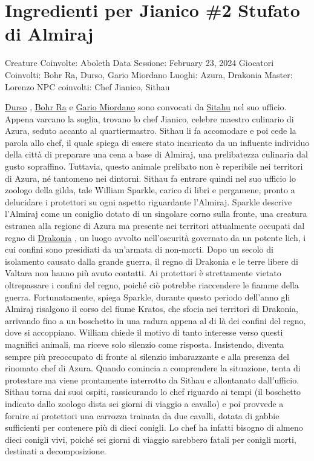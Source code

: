 \section{Ingredienti per Jianico \#2 Stufato di
Almiraj}\label{ingredienti-per-jianico-2-stufato-di-almiraj}

Creature Coinvolte: Aboleth Data Sessione: February 23, 2024 Giocatori
Coinvolti: Bohr Ra, Durso, Gario Miordano Luoghi: Azura, Drakonia
Master: Lorenzo NPC coinvolti: Chef Jianico, Sithau

\href{Durso\%201300f1f2704341b8af557e877374018c.md}{Durso} ,
\href{Bohr\%20Ra\%2064449ef6c46549e9abf62b9d7e01a69d.md}{Bohr Ra} e
\href{Gario\%20Miordano\%20e4415ce5ce8d4e8a834479901942d838.md}{Gario
Miordano} sono convocati da
\href{Sitahu\%203e1abded771c4c39a375ae0243478a44.md}{Sitahu} nel suo
ufficio. Appena varcano la soglia, trovano lo chef Jianico, celebre
maestro culinario di Azura, seduto accanto al quartiermastro. Sithau li
fa accomodare e poi cede la parola allo chef, il quale spiega di essere
stato incaricato da un influente individuo della città di preparare una
cena a base di Almiraj, una prelibatezza culinaria dal gusto sopraffino.
Tuttavia, questo animale prelibato non è reperibile nei territori di
Azura, né tantomeno nei dintorni. Sithau fa entrare quindi nel suo
ufficio lo zoologo della gilda, tale William Sparkle, carico di libri e
pergamene, pronto a delucidare i protettori su ogni aspetto riguardante
l'Almiraj. Sparkle descrive l'Almiraj come un coniglio dotato di un
singolare corno sulla fronte, una creatura estranea alla regione di
Azura ma presente nei territori attualmente occupati dal regno di
\href{Drakonia\%207646694c0d12453293a9b7e41d5cdb15.md}{Drakonia} , un
luogo avvolto nell'oscurità governato da un potente lich, i cui confini
sono presidiati da un'armata di non-morti. Dopo un secolo di isolamento
causato dalla grande guerra, il regno di Drakonia e le terre libere di
Valtara non hanno più avuto contatti. Ai protettori è strettamente
vietato oltrepassare i confini del regno, poiché ciò potrebbe
riaccendere le fiamme della guerra. Fortunatamente, spiega Sparkle,
durante questo periodo dell'anno gli Almiraj risalgono il corso del
fiume Kratos, che sfocia nei territori di Drakonia, arrivando fino a un
boschetto in una radura appena al di là dei confini del regno, dove si
accoppiano. William chiede il motivo di tanto interesse verso questi
magnifici animali, ma riceve solo silenzio come risposta. Insistendo,
diventa sempre più preoccupato di fronte al silenzio imbarazzante e alla
presenza del rinomato chef di Azura. Quando comincia a comprendere la
situazione, tenta di protestare ma viene prontamente interrotto da
Sithau e allontanato dall'ufficio. Sithau torna dai suoi ospiti,
rassicurando lo chef riguardo ai tempi (il boschetto indicato dallo
zoologo dista sei giorni di viaggio a cavallo) e poi provvede a fornire
ai protettori una carrozza trainata da due cavalli, dotata di gabbie
sufficienti per contenere più di dieci conigli. Lo chef ha infatti
bisogno di almeno dieci conigli vivi, poiché sei giorni di viaggio
sarebbero fatali per conigli morti, destinati a decomposizione.

